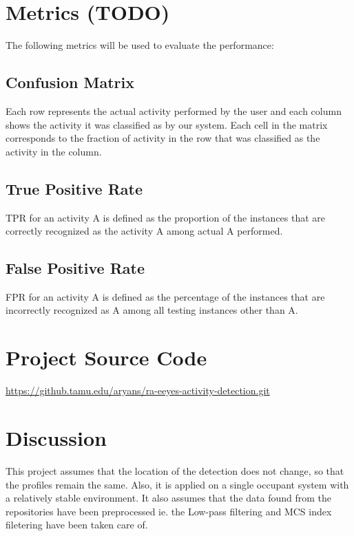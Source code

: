 \documentclass[letterpaper]{article}
\begin{document}
\newpage

\section{Metrics (TODO)}

The following metrics will be used to evaluate the performance:

\subsection{Confusion Matrix}
Each row represents the actual activity performed by the user and each column shows the activity it was classified as by our system. Each cell in the matrix corresponds to the fraction of activity in the row that was classified as the activity in the column.

\subsection{True Positive Rate} 
TPR for an activity A is defined as the proportion of the instances that are correctly recognized as the activity A among actual A performed.

\subsection{False Positive Rate}
FPR for an activity A is defined as the percentage of the instances that are incorrectly recognized as A among all testing instances other than A.


\section{Project Source Code}

\href{https://github.tamu.edu/aryans/ra-eeyes-activity-detection.git}{https://github.tamu.edu/aryans/ra-eeyes-activity-detection.git}

\section{Discussion}

This project assumes that the location of the detection does not change, so that the profiles remain the same. Also, it is applied on a single occupant system with a relatively stable environment. It also assumes that the data found from the repositories have been preprocessed ie. the Low-pass filtering and MCS index filetering have been taken care of.
\end{document}
